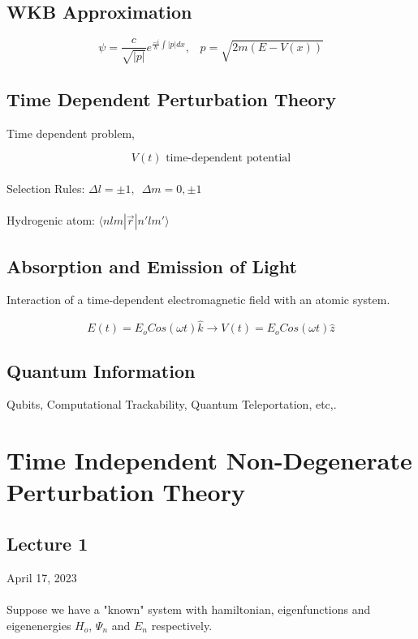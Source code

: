 \documentclass[12pt,fancychapters]{report}
\numberwithin{equation}{section}
\begin{document}
\section{WKB Approximation}
	
$$\psi = \frac{c}{\sqrt{|p|}} e^{\frac{-i}{\hbar}\int |p|dx},\,\,\,\,\, p = \sqrt{2m(E - V(x))}$$

\section{Time Dependent Perturbation Theory}
Time dependent problem,

$$V(t)\,\,\text{time-dependent potential}$$
\\
Selection Rules: $\Delta l = \pm 1, \,\,\,\Delta m = 0, \pm 1$\\
\\
Hydrogenic atom: $\langle nlm |\vec{r}|n'lm' \rangle$

\section{Absorption and Emission of Light}
Interaction of a time-dependent electromagnetic field with an atomic system.

$$E(t) = E_o Cos(\omega t)\hat{k} \longrightarrow V(t) = E_o Cos (\omega t) \hat{z}$$

\section{Quantum Information}
Qubits, Computational Trackability, Quantum Teleportation, etc,.

\newpage
\chapter{Time Independent Non-Degenerate Perturbation Theory}
\section{Lecture 1}
April 17, 2023\\
\\
Suppose we have a "known" system with hamiltonian, eigenfunctions and eigenenergies $H_o$, $\Psi_n$ and $E_n$ respectively.
\end{document}
